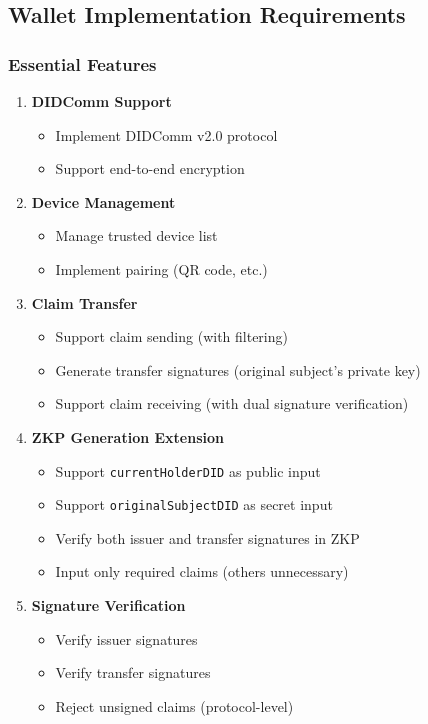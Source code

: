 \subsection{Wallet Implementation Requirements}

\subsubsection{Essential Features}

\begin{enumerate}
  \item \textbf{DIDComm Support}
    \begin{itemize}
      \item Implement DIDComm v2.0 protocol
      \item Support end-to-end encryption
    \end{itemize}

  \item \textbf{Device Management}
    \begin{itemize}
      \item Manage trusted device list
      \item Implement pairing (QR code, etc.)
    \end{itemize}

  \item \textbf{Claim Transfer}
    \begin{itemize}
      \item Support claim sending (with filtering)
      \item Generate transfer signatures (original subject's private key)
      \item Support claim receiving (with dual signature verification)
    \end{itemize}

  \item \textbf{ZKP Generation Extension}
    \begin{itemize}
      \item Support \texttt{currentHolderDID} as public input
      \item Support \texttt{originalSubjectDID} as secret input
      \item Verify both issuer and transfer signatures in ZKP
      \item Input only required claims (others unnecessary)
    \end{itemize}

  \item \textbf{Signature Verification}
    \begin{itemize}
      \item Verify issuer signatures
      \item Verify transfer signatures
      \item Reject unsigned claims (protocol-level)
    \end{itemize}
\end{enumerate}

